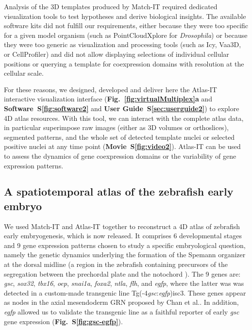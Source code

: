 Analysis of the 3D templates produced by Match-IT required dedicated visualization tools to test hypotheses and derive biological insights. The available software kits did not fulfill our requirements, either because they were too specific for a given model organism (such as PointCloudXplore\cite{rubel2010integrating} for \emph{Drosophila}) or because they were too generic as visualization and processing tools (such as Icy\cite{de2012icy}, Vaa3D\cite{peng2010v3d}, or CellProfiler\cite{jones2008cellprofiler}) and did not allow displaying selections of individual cellular positions or querying a template for coexpression domains with resolution at the cellular scale.



For these reasons, we designed, developed and deliver here the Atlas-IT interactive visualization interface (\textbf{Fig.~\ref{fig:virtualMultiplex}a} and \textbf{Software~S\ref{fig:software2}} and \textbf{User Guide~S\ref{sec:userguide2}}) to explore 4D atlas resources. With this tool, we can interact with the complete atlas data, in particular superimpose raw images (either as 3D volumes or orthoslices), segmented patterns, and the whole set of detected template nuclei or selected positive nuclei at any time point (\textbf{Movie~S\ref{fig:video2}}). Atlas-IT can be used to assess the dynamics of gene coexpression domains or the variability of gene expression patterns.



\subsection*{A spatiotemporal atlas of the zebrafish early embryo}



We used Match-IT and Atlas-IT together to reconstruct a 4D atlas of zebrafish early embryogenesis, which is now released. It comprises 6 developmental stages and 9 gene expression patterns chosen to study a specific embryological question, namely the genetic dynamics underlying the formation of the Spemann organizer at the dorsal midline\cite{schier2005molecular} (a region in the zebrafish containing precursors of the segregation between the prechordal plate and the notochord \cite{saude2000axis}). The 9 genes are: \emph{gsc}, \emph{sox32}, \emph{tbx16}, \emph{oep}, \emph{snai1a}, \emph{foxa2}, \emph{ntla}, \emph{flh}, and \emph{egfp}, where the latter was was detected in a custom-made transgenic line Tg(-4\emph{gsc}:\emph{egfp})isc3. These genes appear as nodes in the axial mesendoderm GRN proposed by Chan et al.\cite{chan2009developmental}. In addition, \emph{egfp} allowed us to validate the transgenic line as a faithful reporter of early \emph{gsc} gene expression (\textbf{Fig.~S\ref{fig:gsc-egfp}}). %


